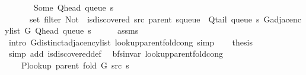 \begin{isabellebody}
\ \ \ \ \ \ {\isacharparenleft}{\kern0pt}{\isasymlambda}{\isacharunderscore}{\kern0pt}{\isachardot}{\kern0pt}\ Some\ {\isacharparenleft}{\kern0pt}Q{\isacharunderscore}{\kern0pt}head\ {\isacharparenleft}{\kern0pt}queue\ s{\isacharparenright}{\kern0pt}{\isacharparenright}{\kern0pt}{\isacharparenright}{\kern0pt}\isanewline
\ \ \ \ \ \ {\isacharparenleft}{\kern0pt}set\ {\isacharparenleft}{\kern0pt}filter\ {\isacharparenleft}{\kern0pt}Not\ {\isasymcirc}\ is{\isacharunderscore}{\kern0pt}discovered\ src\ {\isacharparenleft}{\kern0pt}parent\ {\isacharparenleft}{\kern0pt}s{\isasymlparr}queue\ {\isacharcolon}{\kern0pt}{\isacharequal}{\kern0pt}\ Q{\isacharunderscore}{\kern0pt}tail\ {\isacharparenleft}{\kern0pt}queue\ s{\isacharparenright}{\kern0pt}{\isasymrparr}{\isacharparenright}{\kern0pt}{\isacharparenright}{\kern0pt}{\isacharparenright}{\kern0pt}\ {\isacharparenleft}{\kern0pt}G{\isachardot}{\kern0pt}adjacency{\isacharunderscore}{\kern0pt}list\ G\ {\isacharparenleft}{\kern0pt}Q{\isacharunderscore}{\kern0pt}head\ {\isacharparenleft}{\kern0pt}queue\ s{\isacharparenright}{\kern0pt}{\isacharparenright}{\kern0pt}{\isacharparenright}{\kern0pt}{\isacharparenright}{\kern0pt}{\isacharparenright}{\kern0pt}{\isachardoublequoteclose}\isanewline
\ \ \ \ \isamarkupfalse%
\ assms\isanewline
\ \ \ \ \isamarkupfalse%
\ {\isacharparenleft}{\kern0pt}intro\ G{\isachardot}{\kern0pt}distinct{\isacharunderscore}{\kern0pt}adjacency{\isacharunderscore}{\kern0pt}list\ lookup{\isacharunderscore}{\kern0pt}parent{\isacharunderscore}{\kern0pt}fold{\isacharunderscore}{\kern0pt}cong{\isacharparenright}{\kern0pt}\ simp{\isacharplus}{\kern0pt}\isanewline
\ \ \isamarkupfalse%
\ {\isacharquery}{\kern0pt}thesis\isanewline
\ \ \ \ \isamarkupfalse%
\ {\isacharparenleft}{\kern0pt}simp\ add{\isacharcolon}{\kern0pt}\ is{\isacharunderscore}{\kern0pt}discovered{\isacharunderscore}{\kern0pt}def{\isacharparenright}{\kern0pt}\isanewline
{}\isamarkupfalse%
%
\endisatagproof
{\isafoldproof}%
%
\isadelimproof
\isanewline
%
\endisadelimproof
\isanewline
{}\isamarkupfalse%
\ {\isacharparenleft}{\kern0pt}\ bfs{\isacharunderscore}{\kern0pt}invar{\isacharparenright}{\kern0pt}\ lookup{\isacharunderscore}{\kern0pt}parent{\isacharunderscore}{\kern0pt}fold{\isacharunderscore}{\kern0pt}cong{\isacharcolon}{\kern0pt}\isanewline
\ \ \isanewline
\ \ \ \ {\isachardoublequoteopen}P{\isacharunderscore}{\kern0pt}lookup\ {\isacharparenleft}{\kern0pt}parent\ {\isacharparenleft}{\kern0pt}fold\ G\ src\ s{\isacharparenright}{\kern0pt}{\isacharparenright}{\kern0pt}\ {\isacharequal}{\kern0pt}\isanewline

\end{isabellebody}
